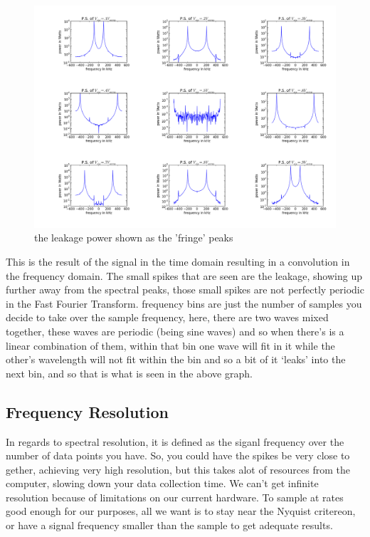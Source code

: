 \documentclass[12 pt]{article}
\begin{document}
\begin{figure}[H]
\center
\includegraphics[scale=0.4]{DFTplotslog.png}
\caption{the leakage power shown as the 'fringe' peaks}
\label{DFTplotslog}
\end{figure}
This is the result of the signal in the time domain resulting in a
convolution in the frequency domain. The small spikes that are seen are
the leakage, showing up further away from the spectral peaks, those
small spikes are not perfectly periodic in the Fast Fourier
Transform. frequency bins are just the number of samples you decide to
take over the sample frequency, here, there are two waves mixed
together, these waves are periodic (being sine waves) and so when
there's is a linear combination of them, within that bin one wave will
fit in it while the other's wavelength will not fit within the bin and
so a bit of it `leaks' into the next bin, and so that is what is seen in
the above graph. 

\subsection{Frequency Resolution}

In regards to spectral resolution, it is defined as the siganl frequency
over the number of data points you have. So, you could have the spikes
be very close to gether, achieving very high resolution, but this takes
alot of resources from the computer, slowing down your data collection
time. We can't get infinite resolution because of limitations on our
current hardware. To sample at rates good enough for our purposes, all
we want is to stay near the Nyquist critereon,  or have a signal
frequency smaller than the sample to get adequate results. 
\end{document}

